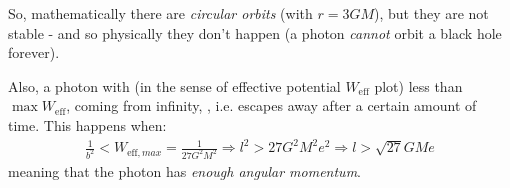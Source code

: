 \documentclass[../template.tex]{subfiles}
\begin{document}
So, mathematically there are \textit{circular orbits} (with $r=3GM$), but they are not stable - and so physically they don't happen (a photon \textit{cannot} orbit a black hole forever).

Also, a photon with  (in the sense of effective potential $W_{\mathrm{eff} }$ plot) less than $\max W_{\mathrm{eff} }$, coming from infinity, , i.e. escapes away after a certain amount of time. This happens when:
\begin{align*}
    \frac{1}{b^2} < W_{\mathrm{eff}, max } = \frac{1}{27 G^2 M^2}  \Rightarrow l^2 > 27 G^2 M^2 e^2 \Rightarrow l > \sqrt{27} GM e
\end{align*} 
meaning that the photon has \textit{enough angular momentum}.  
\end{document}

